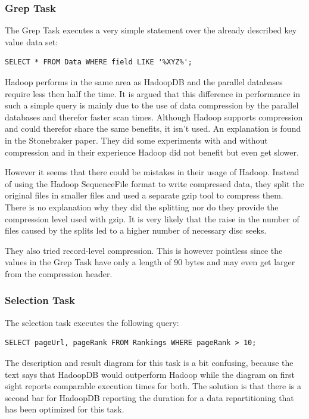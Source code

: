 \documentclass[12pt,a4paper]{scrartcl}		%
\begin{document}
\subsubsection{Grep Task}
The Grep Task executes a very simple statement over the already described key value data set:
\begin{verbatim}
SELECT * FROM Data WHERE field LIKE '%XYZ%';
\end{verbatim}
Hadoop performs in the same area as HadoopDB and the parallel databases require less then half the time. It is argued that this difference in performance in such a simple query is mainly due to the use of data compression by the parallel databases and therefor faster scan times. Although Hadoop supports compression and could therefor share the same benefits, it isn't used. An explanation is found in the Stonebraker paper. They did some experiments with and without compression and in their experience Hadoop did not benefit but even get slower.

However it seems that there could be mistakes in their usage of Hadoop. Instead of using the Hadoop SequenceFile format to write compressed data, they split the original files in smaller files and used a separate gzip tool to compress them. There is no explanation why they did the splitting nor do they provide the compression level used with gzip. It is very likely that the raise in the number of files caused by the splits led to a higher number of necessary disc seeks.

They also tried record-level compression. This is however pointless since the values in the Grep Task have only a length of 90 bytes and may even get larger from the compression header.

\subsubsection{Selection Task}
The selection task executes the following query:
\begin{verbatim}
SELECT pageUrl, pageRank FROM Rankings WHERE pageRank > 10;
\end{verbatim}

The description and result diagram for this task is a bit confusing, because the text says that HadoopDB would outperform Hadoop while the diagram on first sight reports comparable execution times for both. The solution is that there is a second bar for HadoopDB reporting the duration for a data repartitioning that has been optimized for this task.
\end{document}
